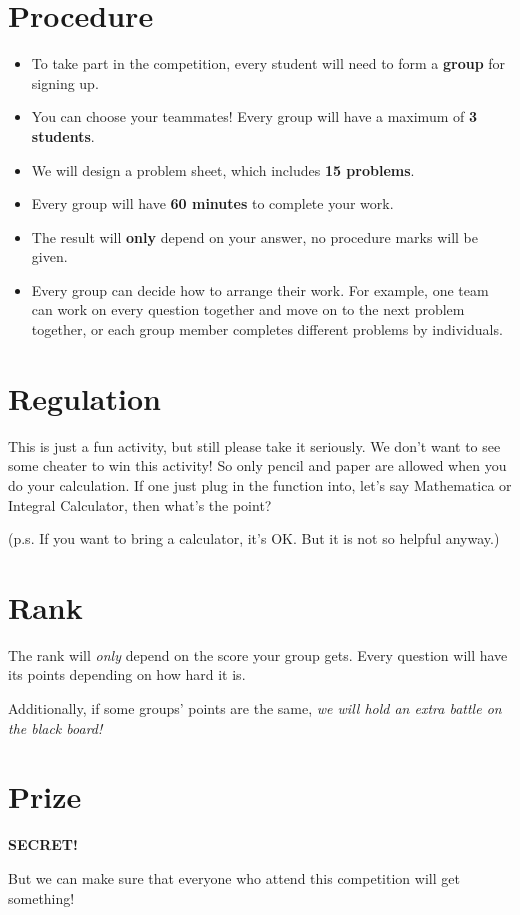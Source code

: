\documentclass[12pt]{article}
\begin{document}


\newpage


\section{Procedure}
\begin{itemize}
    \item To take part in the competition, every student will need to form a \textbf{group} for signing up.
    \item You can choose your teammates! Every group will have a maximum of \textbf{3 students}.
    \item We will design a problem sheet, which includes \textbf{15 problems}.
    \item Every group will have \textbf{60 minutes} to complete your work.
    \item The result will \textbf{only} depend on your answer, no procedure marks will be given.
    \item Every group can decide how to arrange their work. For example, one team can work on every question together and move on to the next problem together, 
    or each group member completes different problems by individuals.
\end{itemize}

\section{Regulation}
\par This is just a fun activity, but still please take it seriously. We don't want to see some cheater to win this activity! So only 
pencil and paper are allowed when you do your calculation. If one just plug in the function into, let's say Mathematica or Integral Calculator, then what's the point?
\begin{flushright}
    (p.s. If you want to bring a calculator, it's OK. But it is not so helpful anyway.)
\end{flushright}
\section{Rank}
\par The rank will \emph{only} depend on the score your group gets. Every question will have its points depending on how hard it is.
\par Additionally, if some groups' points are the same, \emph{we will hold an extra battle on the black board!}

\section{Prize}
\par \textbf{SECRET!} 
\par But we can make sure that everyone who attend this competition will get something!
\end{document}
